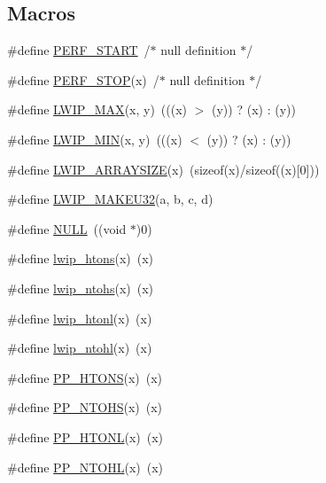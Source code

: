 \subsection*{Macros}
\begin{DoxyCompactItemize}
\item 
\#define \hyperlink{openmote-cc2538_2lwip_2src_2include_2lwip_2def_8h_aa1d6977095e51331f65dcfb2b076da52}{P\+E\+R\+F\+\_\+\+S\+T\+A\+RT}~/$\ast$ null definition $\ast$/
\item 
\#define \hyperlink{openmote-cc2538_2lwip_2src_2include_2lwip_2def_8h_a8ac3afe5d720793a229fbf70a78eb82f}{P\+E\+R\+F\+\_\+\+S\+T\+OP}(x)~/$\ast$ null definition $\ast$/
\item 
\#define \hyperlink{openmote-cc2538_2lwip_2src_2include_2lwip_2def_8h_a21ea174d374106caeafb4aa3a24fbd2b}{L\+W\+I\+P\+\_\+\+M\+AX}(x,  y)~(((x) $>$ (y)) ? (x) \+: (y))
\item 
\#define \hyperlink{openmote-cc2538_2lwip_2src_2include_2lwip_2def_8h_a748f5df614a3fc989e8900fd229d6e4e}{L\+W\+I\+P\+\_\+\+M\+IN}(x,  y)~(((x) $<$ (y)) ? (x) \+: (y))
\item 
\#define \hyperlink{openmote-cc2538_2lwip_2src_2include_2lwip_2def_8h_a4abb61f4c9339d8a0a0c63b4fbfe6a37}{L\+W\+I\+P\+\_\+\+A\+R\+R\+A\+Y\+S\+I\+ZE}(x)~(sizeof(x)/sizeof((x)\mbox{[}0\mbox{]}))
\item 
\#define \hyperlink{openmote-cc2538_2lwip_2src_2include_2lwip_2def_8h_acf56d3da92a0a7a8a62a617e793e948c}{L\+W\+I\+P\+\_\+\+M\+A\+K\+E\+U32}(a,  b,  c,  d)
\item 
\#define \hyperlink{openmote-cc2538_2lwip_2src_2include_2lwip_2def_8h_a070d2ce7b6bb7e5c05602aa8c308d0c4}{N\+U\+LL}~((void $\ast$)0)
\item 
\#define \hyperlink{openmote-cc2538_2lwip_2src_2include_2lwip_2def_8h_a3cdda64857295e6661fb7962f66adfb9}{lwip\+\_\+htons}(x)~(x)
\item 
\#define \hyperlink{openmote-cc2538_2lwip_2src_2include_2lwip_2def_8h_ac642bf6057869696d7807564d8309ffc}{lwip\+\_\+ntohs}(x)~(x)
\item 
\#define \hyperlink{openmote-cc2538_2lwip_2src_2include_2lwip_2def_8h_a9c0cf5ec6af0664ca8cea5bcf6319a56}{lwip\+\_\+htonl}(x)~(x)
\item 
\#define \hyperlink{openmote-cc2538_2lwip_2src_2include_2lwip_2def_8h_a56098407d66feb75806f655bafbee81d}{lwip\+\_\+ntohl}(x)~(x)
\item 
\#define \hyperlink{openmote-cc2538_2lwip_2src_2include_2lwip_2def_8h_a0dfd02d7c09f9c698a5a7ecc0b7287ad}{P\+P\+\_\+\+H\+T\+O\+NS}(x)~(x)
\item 
\#define \hyperlink{openmote-cc2538_2lwip_2src_2include_2lwip_2def_8h_a7d17b88eabf7766c0bfa89d8f965f67e}{P\+P\+\_\+\+N\+T\+O\+HS}(x)~(x)
\item 
\#define \hyperlink{openmote-cc2538_2lwip_2src_2include_2lwip_2def_8h_afea9c21aa1f56180cdf6fb42ef14a294}{P\+P\+\_\+\+H\+T\+O\+NL}(x)~(x)
\item 
\#define \hyperlink{openmote-cc2538_2lwip_2src_2include_2lwip_2def_8h_a632e77d07286fb8a0926d8aac7aae89f}{P\+P\+\_\+\+N\+T\+O\+HL}(x)~(x)
\end{DoxyCompactItemize}
